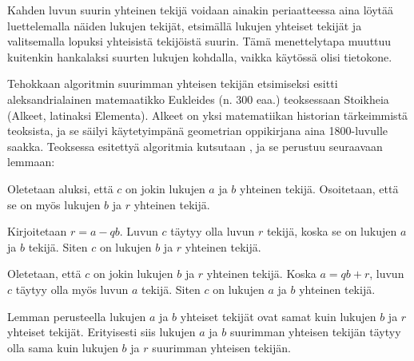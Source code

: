 Kahden luvun suurin yhteinen tekijä voidaan ainakin periaatteessa aina löytää luettelemalla näiden lukujen tekijät, etsimällä lukujen yhteiset tekijät ja valitsemalla lopuksi yhteisistä tekijöistä suurin. Tämä menettelytapa muuttuu kuitenkin hankalaksi suurten lukujen kohdalla, vaikka käytössä olisi tietokone.

Tehokkaan algoritmin suurimman yhteisen tekijän etsimiseksi esitti aleksandrialainen matemaatikko Eukleides (n. 300 eaa.) teoksessaan Stoikheia (Alkeet, latinaksi Elementa). Alkeet on yksi matematiikan historian tärkeimmistä teoksista, ja se säilyi käytetyimpänä geometrian oppikirjana aina 1800-luvulle saakka. Teoksessa esitettyä algoritmia kutsutaan , ja se perustuu seuraavaan lemmaan:



\begin{todistus}
Oletetaan aluksi, että $c$ on jokin lukujen $a$ ja $b$ yhteinen tekijä. Osoitetaan, että se on myös lukujen $b$ ja $r$ yhteinen tekijä.

Kirjoitetaan $r=a-qb$. Luvun $c$ täytyy olla luvun $r$ tekijä, koska se on lukujen $a$ ja $b$ tekijä. Siten $c$ on lukujen $b$ ja $r$ yhteinen tekijä.

Oletetaan, että $c$ on jokin lukujen $b$ ja $r$ yhteinen tekijä. Koska $a=qb+r$, luvun $c$ täytyy olla myös luvun $a$ tekijä. Siten $c$ on lukujen $a$ ja $b$ yhteinen tekijä.

\end{todistus}


\begin{todistus}
Lemman perusteella lukujen $a$ ja $b$ yhteiset tekijät ovat samat kuin lukujen $b$ ja $r$ yhteiset tekijät. Erityisesti siis lukujen $a$ ja $b$ suurimman yhteisen tekijän täytyy olla sama kuin lukujen $b$ ja $r$ suurimman yhteisen tekijän.
\end{todistus}

